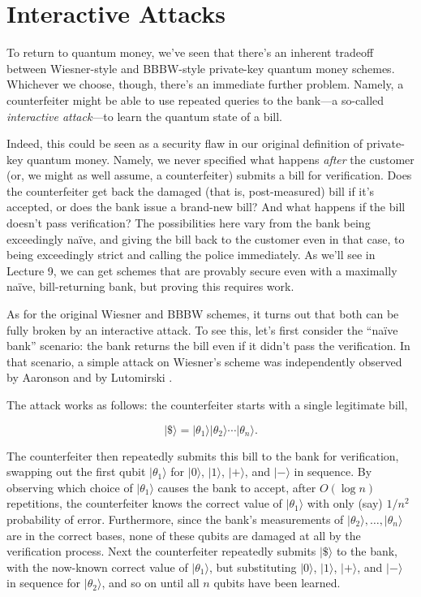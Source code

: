 \documentclass[11pt]{report}
\theoremstyle{plain}
\theoremstyle{definition}
\renewcommand{\ket}[1]{|#1\rangle}
\begin{document}
\section{Interactive Attacks}

To return to quantum money, we've seen that there's an inherent tradeoff between Wiesner-style and BBBW-style private-key quantum money schemes.  Whichever we choose, though, there's an immediate further problem.  Namely, a counterfeiter might be able to use repeated queries to the bank---a so-called {\em interactive attack}---to learn the quantum state of a bill.

Indeed, this could be seen as a security flaw in our original definition of private-key quantum money.  Namely, we never specified what happens {\em after} the customer (or, we might as well assume, a counterfeiter) submits a bill for verification.  Does the counterfeiter get back the damaged (that is, post-measured) bill if it's accepted, or does the bank issue a brand-new bill?  And what happens if the bill doesn't pass verification? The possibilities here vary from the bank being exceedingly na\"{i}ve, and giving the bill back to the customer even in that case, to being exceedingly strict and calling the police immediately.  As we'll see in Lecture 9, we can get schemes that are provably secure even with a maximally na\"{i}ve, bill-returning bank, but proving this requires work.

As for the original Wiesner and BBBW schemes, it turns out that both can be fully broken by an interactive attack.  To see this, let's first consider the ``na\"{i}ve bank'' scenario: the bank returns the bill even if it didn't pass the verification.  In that scenario, a simple attack on Wiesner's scheme was independently observed by Aaronson \cite{Aar09} and by Lutomirski \cite{lutomirski:attack}.

The attack works as follows: the counterfeiter starts with a single legitimate bill,

$$ \ket{\$} = \ket{\theta_1} \ket{\theta_2} \cdots \ket{\theta_n}. $$

The counterfeiter then repeatedly submits this bill to the bank for verification, swapping out the first qubit $\ket{\theta_1}$ for $\ket{0}$, $\ket{1}$, $\ket{+}$, and $\ket{-}$ in sequence.  By observing which choice of $\ket{\theta_1}$ causes the bank to accept, after $O(\log n)$ repetitions, the counterfeiter knows the correct value of $\ket{\theta_1}$ with only (say) $1/n^2$ probability of error.  Furthermore, since the bank's measurements of $\ket{\theta_2}, \ldots, \ket{\theta_n}$ are in the correct bases, none of these qubits are damaged at all by the verification process.  Next the counterfeiter repeatedly submits $\ket{\$}$ to the bank, with the now-known correct value of $\ket{\theta_1}$, but substituting $\ket{0}$, $\ket{1}$, $\ket{+}$, and $\ket{-}$ in sequence for $\ket{\theta_2}$, and so on until all $n$ qubits have been learned.
\end{document}
